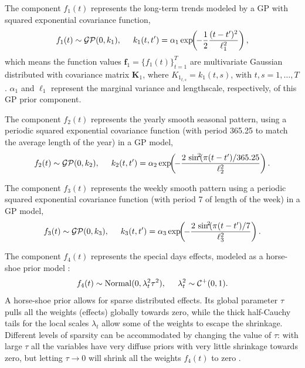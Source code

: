 \documentclass[onecolumn,a4paper,11pt]{article}
\DeclareMathOperator{\GP}{\mathcal{GP}}
\DeclareMathOperator{\Normal}{Normal}
\begin{document}
The component $f_1(t)$ represents the long-term trends modeled by a GP with squared exponential covariance function,
%
\begin{equation*}
f_1(t) \sim \GP(0,k_1), \hspace{5mm} k_1(t,t') = \alpha_1 \exp\!\!\left(\!-\frac{1}{2} \frac{(t-t')^2}{\ell_1^2}\right), 
\end{equation*}
%
which means the function values $\bm{f}_1=\{f_1(t)\}_{t=1}^T$ are multivariate Gaussian distributed with covariance matrix $\bm{K}_1$, where $K_{1_{t,s}}=k_1(t,s)$, with $t,s=1,\dots,T$. $\alpha_1$ and $\ell_1$ represent the marginal variance and lengthscale, respectively, of this GP prior component.

The component $f_2(t)$ represents the yearly smooth seasonal pattern, using a periodic squared exponential covariance function (with period 365.25 to match the average length of the year) in a GP model,
%
\begin{equation*}
f_2(t) \sim \GP(0,k_2), \hspace{5mm} k_2(t,t') = \alpha_2 \exp\!\!\left(\!-\frac{2\,\sin^{\!2}\!(\pi(t-t')/365.25}{\ell_2^2}\right).
\end{equation*}

The component $f_3(t)$ represents the weekly smooth pattern using a periodic squared exponential covariance function (with period 7 of length of the week) in a GP model,
%
\begin{equation*}
f_3(t) \sim \GP(0,k_3), \hspace{5mm} k_3(t,t') = \alpha_3 \exp\!\!\left(\!-\frac{2\,\sin^{\!2}\!(\pi(t-t')/7}{\ell_3^2}\right). 
\end{equation*}

The component $f_4(t)$ represents the special days effects, modeled as a horse-shoe prior model \citep{carvalho2010,piironen2017sparsity}:
%
\begin{equation*}
f_4(t) \sim \Normal(0,\lambda^2_t \tau^2), \hspace{5mm} \lambda^2_t \sim \mathcal{C}^{+}(0,1).
\end{equation*}
%
A horse-shoe prior allows for sparse distributed effects. Its global parameter $\tau$ pulls all the weights (effects) globally towards zero, while the thick half-Cauchy tails for the local scales $\lambda_t$ allow some of the weights to escape the shrinkage. Different levels of sparsity can be accommodated by changing the value of $\tau$: with large $\tau$ all the variables have very diffuse priors with very little shrinkage towards zero, but letting $\tau \rightarrow 0$ will shrink all the weights $f_4(t)$ to zero \citep{piironen2016hyperprior}. 
\end{document}
